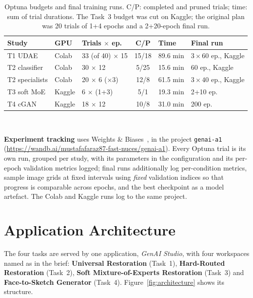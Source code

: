 \documentclass[conference]{IEEEtran}
\begin{document}
\begin{table}[t]
\caption{Optuna budgets and final training runs. C/P: completed and pruned
trials; time: sum of trial durations. The Task~3 budget was cut on Kaggle; the
original plan was 20 trials of 1+4 epochs and a 2+20-epoch final run.}
\label{tab:budgets}
\centering
\footnotesize
\setlength{\tabcolsep}{2pt}
\begin{tabular}{@{}lllcll@{}}
\toprule
Study & GPU & Trials $\times$ ep. & C/P & Time & Final run \\
\midrule
T1 UDAE & Colab & 33 (of 40) $\times$ 15 & 15/18 & 89.6 min & $3{\times}60$ ep., Kaggle \\
T2 classifier & Colab & 30 $\times$ 12 & 5/25 & 15.6 min & 60 ep., Kaggle \\
T2 specialists & Colab & 20 $\times$ 6 ($\times 3$) & 12/8 & 61.5 min & $3{\times}40$ ep., Kaggle \\
T3 soft MoE & Kaggle & 6 $\times$ (1+3) & 5/1 & 19.3 min & 2+10 ep. \\
T4 cGAN & Kaggle & 18 $\times$ 12 & 10/8 & 31.0 min & 200 ep. \\
\bottomrule
\end{tabular}
\\[2pt]

\end{table}

\textbf{Experiment tracking} uses Weights \& Biases~\cite{wandb}, in the project
\texttt{genai-a1}
(\url{https://wandb.ai/mustafafaraz87-fast-nuces/genai-a1}). Every Optuna trial is
its own run, grouped per study, with its parameters in the configuration and its
per-epoch validation metrics logged; final runs additionally log per-condition
metrics, sample image grids at fixed intervals using \emph{fixed} validation
indices so that progress is comparable across epochs, and the best checkpoint as
a model artefact. The Colab and Kaggle runs log to the same project.


\section{Application Architecture}
\label{sec:app}

The four tasks are served by one application, \emph{GenAI Studio}, with four
workspaces named as in the brief: \textbf{Universal Restoration} (Task~1),
\textbf{Hard-Routed Restoration} (Task~2), \textbf{Soft Mixture-of-Experts
Restoration} (Task~3) and \textbf{Face-to-Sketch Generator} (Task~4).
Figure~\ref{fig:architecture} shows its structure.
\end{document}
